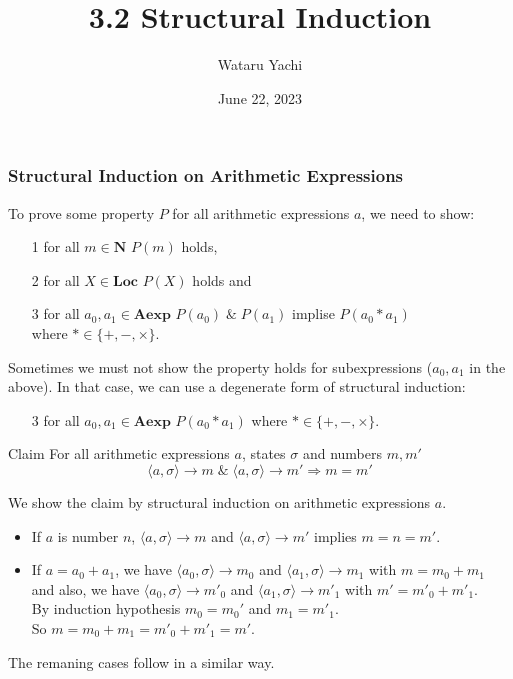 \documentclass[12pt,aspectratio=169]{beamer}
\title{3.2 Structural Induction}
\author{Wataru Yachi}
\institute{JAIST}
\date{June 22, 2023}
\newcommand{\cmd}[3]{\langle #1, #2 \rangle \to #3}
\begin{document}
\maketitle

\begin{frame}
    \frametitle{Structural Induction on Arithmetic Expressions}
    To prove some property $P$ for all arithmetic expressions $a$, we need to show:
    \begin{itemize}
        \item [1] for all $m \in \mathbf{N}$ $P(m)$ holds,
        \item [2] for all $X \in \mathbf{Loc}$ $P(X)$ holds and
        \item [3] for all $a_0, a_1 \in \mathbf{Aexp}$ $P(a_0)\; \& \; P(a_1)$ implise $P(a_0 * a_1)$ \\
            where $* \in \{+, -, \times\}$.
    \end{itemize}
    Sometimes we must not show the property holds for subexpressions ($a_0, a_1$ in the above).
    In that case, we can use a degenerate form of structural induction:
    \begin{itemize}
        \item [3] for all $a_0, a_1 \in \mathbf{Aexp}$ $P(a_0 * a_1)$ where $* \in \{+, -, \times\}$.
    \end{itemize}

\end{frame}

\begin{frame}
    \begin{block}{Claim}
        For all arithmetic expressions $a$, states $\sigma$
        and numbers $m, m'$
        \[
            \langle a, \sigma \rangle \to m \; \& \;
                \langle a, \sigma \rangle \to m'
                    \Rightarrow m = m'
        \]
    \end{block}

    \begin{Proof}
        We show the claim by structural induction on arithmetic expressions $a$.

        \begin{itemize}
            \item If $a$ is number $n$, $\cmd{a}{\sigma}{m}$ and $\cmd{a}{\sigma}{m'}$ implies $m = n = m'$.
            \item If $a = a_0 + a_1$, we have $\cmd{a_0}{\sigma}{m_0}$ and $\cmd{a_1}{\sigma}{m_1}$ with $ m = m_0 + m_1$
                and also, we have $\cmd{a_0}{\sigma}{m'_0}$ and $\cmd{a_1}{\sigma}{m'_1}$ with $ m' = m'_0 + m'_1$.\\ 
                By induction hypothesis $m_0 = m_0'$ and $m_1 = m'_1$.\\
                So $ m = m_0 + m_1 = m'_0 + m'_1 = m'$.
        \end{itemize}
        The remaning cases follow in a similar way.
    \end{Proof}
\end{frame}
\end{document}
